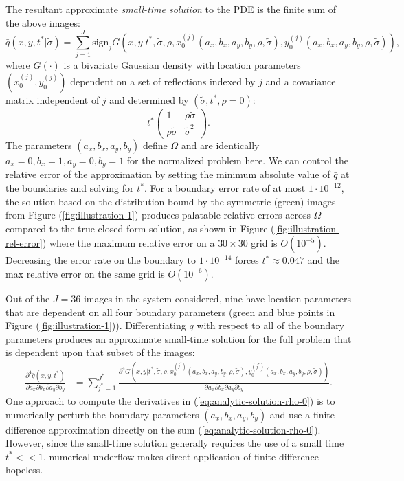 The resultant approximate \textit{small-time solution} to the PDE is
the finite sum of the above images:
\begin{equation}
  \bar{q}(x, y, t^{*}|\tilde{\sigma}) = \sum_{j=1}^J \mbox{sign}_j
  G(x,y|t^*, \tilde{\sigma}, \rho, x_0^{(j)}(a_x, b_x, a_y, b_y, \rho, \tilde{\sigma}),
  y_0^{(j)}(a_x, b_x, a_y, b_y, \rho, \tilde{\sigma})), \label{eq:small-time-sol}
\end{equation}
where $G(\cdot)$ is a bivariate Gaussian density with location
parameters $(x^{(j)}_0,y^{(j)}_0)$ dependent on a set of reflections indexed by $j$ and a
covariance matrix independent of $j$ and determined by
$(\tilde{\sigma}, t^*, \rho = 0)$:
\[
  t^{*} \left( \begin{array}{cc}
                 1 & \rho\tilde{\sigma} \\
                 \rho\tilde{\sigma} & \tilde{\sigma}^2
               \end{array} \right).
\]
The parameters $(a_x,b_x,a_y,b_y)$ define $\Omega$ and are identically
$a_x =0, b_x=1, a_y=0,b_y=1$ for the normalized problem here. We can
control the relative error of the approximation by setting the minimum
absolute value of $\bar{q}$ at the boundaries and solving for
$t^{*}$. For a boundary error rate of at most $1 \cdot 10^{-12}$, the
solution based on the distribution bound by the symmetric (green)
images from Figure (\ref{fig:illustration-1}) produces palatable
relative errors across $\Omega$ compared to the true closed-form
solution, as shown in Figure (\ref{fig:illustration-rel-error}) where
the maximum relative error on a $30 \times 30$ grid is $O(10^{-5})$.
Decreasing the error rate on the boundary to $1 \cdot 10^{-14}$ forces
$t^* \approx 0.047$ and the max relative error on the same grid is
$O(10^{-6})$.

Out of the $J=36$ images in the system considered, nine have location
parameters that are dependent on all four boundary parameters (green
and blue points in Figure (\ref{fig:illustration-1})). Differentiating
$\bar{q}$ with respect to all of the boundary parameters produces an
approximate small-time solution for the full problem that is dependent
upon that subset of the images:
\begin{align}
  \frac{\partial^4 \bar{q}(x, y, t^{*})}{\partial a_x
  \partial b_x \partial a_y \partial b_y} &= \sum_{j^*=1}^{J^*} \frac{\partial^4
                                            G(x,y|t^{*}, \tilde{\sigma}, \rho, x_0^{(j^*)}(a_x, b_x, a_y, b_y, \rho, \tilde{\sigma}),
                                            y_0^{(j^*)}(a_x, b_x, a_y, b_y, \rho, \tilde{\sigma}))} {\partial a_x \partial b_x
                                            \partial a_y \partial b_y}. \label{eq:analytic-solution-rho-0}
\end{align}
One approach to compute the derivatives in
(\ref{eq:analytic-solution-rho-0}) is to numerically perturb the
boundary parameters $(a_x,b_x,a_y,b_y)$ and use a finite difference
approximation directly on the sum
(\ref{eq:analytic-solution-rho-0}). However, since the small-time
solution generally requires the use of a small time $t^* << 1$,
numerical underflow makes direct application of finite difference
hopeless.

